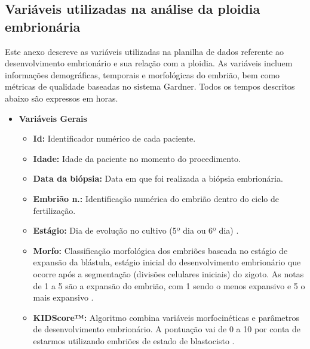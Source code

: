 \begin{apendicesenv}

\partapendices

\chapter{Variáveis utilizadas na análise da ploidia embrionária}

Este anexo descreve as variáveis utilizadas na planilha de dados referente ao desenvolvimento embrionário e sua relação com a ploidia. As variáveis incluem informações demográficas, temporais e morfológicas do embrião, bem como métricas de qualidade baseadas no sistema Gardner. Todos os tempos descritos abaixo são expressos em horas.

\begin{itemize}
  \item \textbf{Variáveis Gerais}
  \begin{itemize}
      \item \textbf{Id:} Identificador numérico de cada paciente.
      \item \textbf{Idade:} Idade da paciente no momento do procedimento.
      \item \textbf{Data da biópsia:} Data em que foi realizada a biópsia embrionária.
      \item \textbf{Embrião n.:} Identificação numérica do embrião dentro do ciclo de fertilização.
      \item \textbf{Estágio:} Dia de evolução no cultivo (5º dia ou 6º dia) \cite{ramalho2024}.
      \item \textbf{Morfo:} Classificação morfológica dos embriões baseada no estágio de expansão da blástula, estágio inicial do desenvolvimento embrionário que ocorre após a segmentação (divisões celulares iniciais) do zigoto. As notas de 1 a 5 são a expansão do embrião, com 1 sendo o menos expansivo e 5 o mais expansivo \cite{ramalho2024}.
      \item \textbf{KIDScore™:} Algoritmo combina variáveis morfocinéticas e parâmetros de desenvolvimento embrionário. A pontuação vai de 0 a 10 por conta de estarmos utilizando embriões de estado de blastocisto \cite{gazzo2020}. 
  \end{itemize}
\end{itemize}


\end{apendicesenv}

